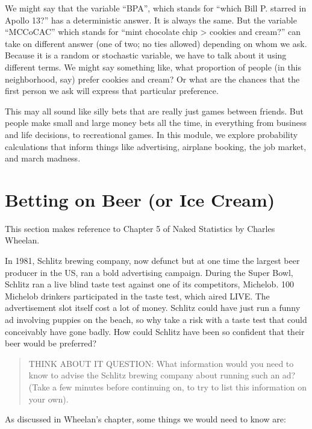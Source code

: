 \documentclass[openany]{book}
\begin{document}
We might say that the variable ``BPA'', which stands for ``which Bill P. starred in Apollo 13?'' has a deterministic answer. It is always the same. But the variable ``MCCoCAC'' which stands for ``mint chocolate chip \textgreater{} cookies and cream?'' can take on different answer (one of two; no ties allowed) depending on whom we ask. Because it is a random or stochastic variable, we have to talk about it using different terms. We might say something like, what proportion of people (in this neighborhood, say) prefer cookies and cream? Or what are the chances that the first person we ask will express that particular preference.

This may all sound like silly bets that are really just games between friends. But people make small and large money bets all the time, in everything from business and life decisions, to recreational games. In this module, we explore probability calculations that inform things like advertising, airplane booking, the job market, and march madness.

\hypertarget{betting-on-beer-or-ice-cream}{%
\chapter{Betting on Beer (or Ice Cream)}\label{betting-on-beer-or-ice-cream}}

This section makes reference to Chapter 5 of Naked Statistics by Charles Wheelan.

In 1981, Schlitz brewing company, now defunct but at one time the largest beer producer in the US, ran a bold advertising campaign. During the Super Bowl, Schlitz ran a live blind taste test against one of its competitors, Michelob. 100 Michelob drinkers participated in the taste test, which aired LIVE. The advertisement slot itself cost a lot of money. Schlitz could have just run a funny ad involving puppies on the beach, so why take a risk with a taste test that could conceivably have gone badly. How could Schlitz have been so confident that their beer would be preferred?

\begin{quote}
THINK ABOUT IT QUESTION: What information would you need to know to advise the Schlitz brewing company about running such an ad? (Take a few minutes before continuing on, to try to list this information on your own).
\end{quote}

As discussed in Wheelan's chapter, some things we would need to know are:
\end{document}
